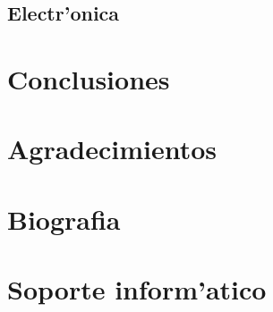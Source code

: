 \documentclass[twoside]{article}
\begin{document}
\subsection{Electr'onica}
\newpage

\section{Conclusiones}
\newpage

\section{Agradecimientos}
\newpage

\section{Biografia}
\newpage

\section{Soporte inform'atico}
\end{document}

